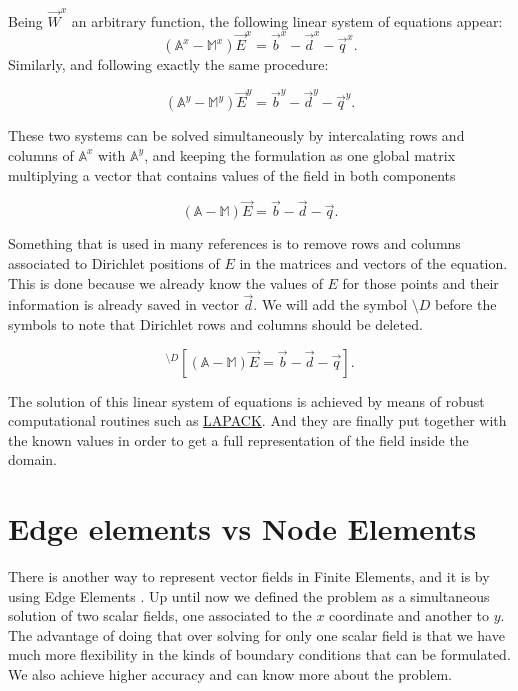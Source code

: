 Being $\vec{W}^x$ an arbitrary function, the following linear system of equations appear:
\begin{equation}
\left(\mathbb{A}^x-\mathbb{M}^x\right)\vec{E}^x = \vec{b}^x-\vec{d}^x-\vec{q}^x. \label{eq:harmonic_eq_sys_x}
\end{equation}
Similarly, and following exactly the same procedure:

\begin{equation}
\left(\mathbb{A}^y-\mathbb{M}^y\right)\vec{E}^y = \vec{b}^y-\vec{d}^y-\vec{q}^y. \label{eq:harmonic_eq_sys_y}
\end{equation}


These two systems can be solved simultaneously by intercalating rows and columns of $\mathbb{A}^x$ with $\mathbb{A}^y$, and keeping the formulation as one global matrix multiplying a vector that contains values of the field in both components


\begin{equation*}
\left(\mathbb{A}-\mathbb{M}\right)\vec{E} = \vec{b}-\vec{d}-\vec{q}.
\end{equation*}

Something that is used in many references is to remove rows and columns associated to Dirichlet positions of $E$ in the matrices and vectors of the equation. This is done because we already know the values of $E$ for those points and their information is already saved in vector $\vec{d}$. We will add the symbol $\setminus D$ before the symbols to note that Dirichlet rows and columns should be deleted.

\begin{equation*}
^{\setminus D}\left[\left(\mathbb{A}-\mathbb{M}\right)\vec{E}= \vec{b}-\vec{d}-\vec{q}\right].
\label{eq:harmonic_eq_dirichlet}
\end{equation*}

The solution of this linear system of equations is achieved by means of robust computational routines such as \href{http://www.netlib.org/lapack/}{LAPACK}. And they are finally put together with the known values in order to get a full representation of the field inside the domain.

\section{Edge elements vs Node Elements}
There is another way to represent vector fields in Finite Elements, and it is by using Edge Elements \cite{Jin2010}. Up until now we defined the problem as a simultaneous solution of two scalar fields, one associated to the $x$ coordinate and another to $y$. The advantage of doing that over solving for only one scalar field is that we have much more flexibility in the kinds of boundary conditions that can be formulated. We also achieve higher accuracy and can know more about the problem.

